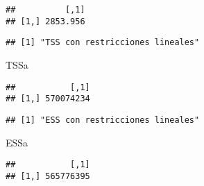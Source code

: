 \documentclass[
]{article}
\newenvironment{Shaded}{\begin{snugshade}}{\end{snugshade}}
\newcommand{\CommentTok}[1]{\textcolor[rgb]{0.56,0.35,0.01}{\textit{#1}}}
\newcommand{\DecValTok}[1]{\textcolor[rgb]{0.00,0.00,0.81}{#1}}
\newcommand{\KeywordTok}[1]{\textcolor[rgb]{0.13,0.29,0.53}{\textbf{#1}}}
\newcommand{\NormalTok}[1]{#1}
\newcommand{\OperatorTok}[1]{\textcolor[rgb]{0.81,0.36,0.00}{\textbf{#1}}}
\newcommand{\StringTok}[1]{\textcolor[rgb]{0.31,0.60,0.02}{#1}}
\begin{document}
\begin{verbatim}
##          [,1]
## [1,] 2853.956
\end{verbatim}

\begin{Shaded}
\end{Shaded}

\begin{verbatim}
## [1] "TSS con restricciones lineales"
\end{verbatim}

\begin{Shaded}
\begin{Highlighting}[]
\NormalTok{TSSa}
\end{Highlighting}
\end{Shaded}

\begin{verbatim}
##           [,1]
## [1,] 570074234
\end{verbatim}

\begin{Shaded}
\end{Shaded}

\begin{verbatim}
## [1] "ESS con restricciones lineales"
\end{verbatim}

\begin{Shaded}
\begin{Highlighting}[]
\NormalTok{ESSa}
\end{Highlighting}
\end{Shaded}

\begin{verbatim}
##           [,1]
## [1,] 565776395
\end{verbatim}
\end{document}
